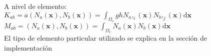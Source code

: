A nivel de elemento:\\

$K_{ab} = a(N_a(\boldsymbol{x}), N_b(\boldsymbol{x})) = \int_{\Omega_e} gh N_a,_i(\boldsymbol{x}) N_b,_j(\boldsymbol{x}) \mathrm{d}\boldsymbol{x} $\\

$M_{ab} = (N_a(\boldsymbol{x}), N_b(\boldsymbol{x})) = \int_{\Omega_e} N_a(\boldsymbol{x}) N_b(\boldsymbol{x}) \mathrm{d}\boldsymbol{x} $\\

El tipo de elemento particular utilizado se explica en la secci\'on de implementaci\'on






